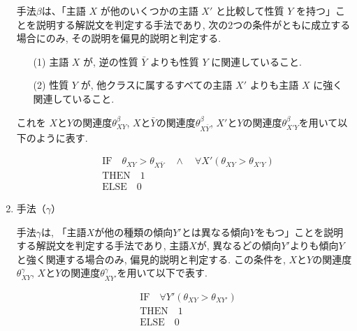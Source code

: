 \documentclass[dvipdfmx]{jsarticle}
\begin{document}
\begin{enumerate}
        手法$\beta$は、「主語 $X$ が他のいくつかの主語 $X'$ と比較して性質 $Y$ を持つ」ことを説明する解説文を判定する手法であり, 次の2つの条件がともに成立する場合にのみ, その説明を偏見的説明と判定する.
        \vspace{1em}
        \begin{itemize}
          \item[(1)] 主語 $X$ が, 逆の性質 $\bar{Y}$ よりも性質 $Y$ に関連していること.
          \item[(2)] 性質 $Y$ が, 他クラスに属するすべての主語 $X'$ よりも主語 $X$ に強く関連していること.
        \end{itemize}
        \vspace{1em}

        これを $X$と$Y$の関連度$\theta^{\beta}_{XY}$, $X$と$\bar{Y}$の関連度$\theta^{\beta}_{X\bar{Y}}$, $X'$と$Y$の関連度$\theta^{\beta}_{X'Y}$を用いて以下のように表す.

        \begin{align}
           & \text{IF} \quad \theta_{XY} > \theta_{X\bar{Y}} \quad \land \quad \forall X' \left( \theta_{XY} > \theta_{X'Y} \right) \\
           & \text{THEN} \quad 1                                                                                                    \\
           & \text{ELSE} \quad 0 \tag{2.2}
        \end{align}

        \vspace{1em}

  \item 手法（$\gamma$）

        手法$\gamma$は, 「主語$X$が他の種類の傾向$Y'$とは異なる傾向$Y$をもつ」ことを説明する解説文を判定する手法であり, 主語$X$が, 異なるどの傾向$Y'$よりも傾向$Y$と強く関連する場合のみ, 偏見的説明と判定する. この条件を, $X$と$Y$の関連度$\theta^{\gamma}_{XY}$, $X$と$Y$の関連度$\theta^{\gamma}_{XY'}$を用いて以下で表す.

        \begin{align}
           & \text{IF} \quad \forall Y' \left( \theta_{XY} > \theta_{XY'} \right) \\
           & \text{THEN} \quad 1                                                  \\
           & \text{ELSE} \quad 0
        \end{align}

\end{enumerate}
\end{document}
